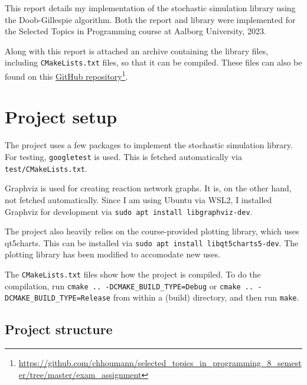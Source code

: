 This report details my implementation of the stochastic simulation library using the Doob-Gillespie algorithm.
Both the report and library were implemented for the Selected Topics in Programming course at Aalborg University, 2023.

Along with this report is attached an archive containing the library files, including \texttt{CMakeLists.txt} files, so that it can be compiled.
These files can also be found on this \href{https://github.com/chhoumann/selected_topics_in_programming_8_semester/tree/master/exam_assignment}{GitHub repository}\footnote{\url{https://github.com/chhoumann/selected_topics_in_programming_8_semester/tree/master/exam_assignment}}.

\section{Project setup}
The project uses a few packages to implement the stochastic simulation library.
For testing, \texttt{googletest} is used. This is fetched automatically via \texttt{test/CMakeLists.txt}.

Graphviz is used for creating reaction network graphs. It is, on the other hand, not fetched automatically.
Since I am using Ubuntu via WSL2, I installed Graphviz for development via \texttt{sudo apt install libgraphviz-dev}.

The project also heavily relies on the course-provided plotting library, which uses qt5charts.
This can be installed via \texttt{sudo apt install libqt5charts5-dev}. The plotting library has been modified to accomodate new uses.

The \texttt{CMakeLists.txt} files show how the project is compiled.
To do the compilation, run \texttt{cmake .. -DCMAKE\_BUILD\_TYPE=Debug} or \texttt{cmake .. -DCMAKE\_BUILD\_TYPE=Release} from within a (build) directory, and then run \texttt{make}.

\subsection{Project structure}

